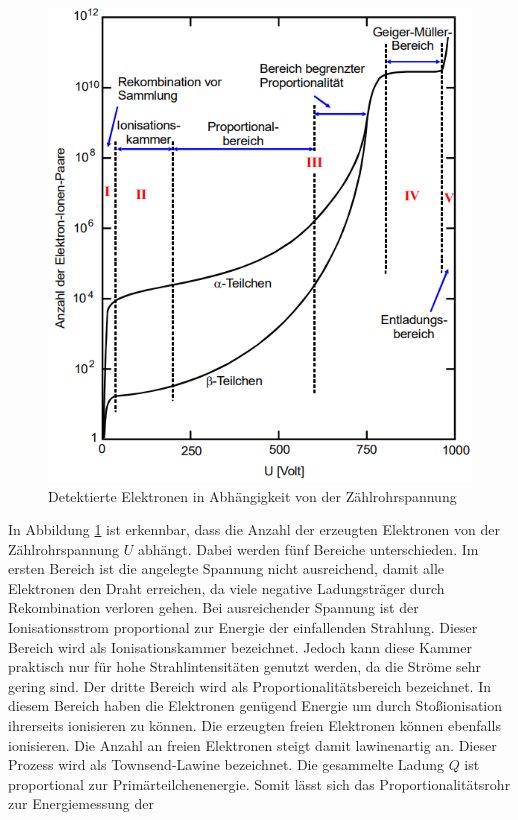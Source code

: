 \begin{figure}
    \centering
    \includegraphics[scale=0.6]{pics/Elektronen.png}
    \caption{Detektierte Elektronen in Abhängigkeit von der Zählrohrspannung}
    \label{fig:Elektronen}
  \end{figure}
In Abbildung \ref{fig:Elektronen} ist erkennbar, dass die Anzahl der erzeugten Elektronen von der Zählrohrspannung $U$ abhängt.
Dabei werden fünf Bereiche unterschieden. Im ersten Bereich ist die angelegte Spannung nicht ausreichend, damit alle Elektronen den Draht erreichen, da viele negative Ladungsträger
durch Rekombination verloren gehen.
Bei ausreichender Spannung ist der Ionisationsstrom proportional zur Energie der einfallenden Strahlung.
Dieser Bereich wird als Ionisationskammer bezeichnet.
Jedoch kann diese Kammer praktisch nur für hohe Strahlintensitäten genutzt werden, da die Ströme sehr gering sind.
Der dritte Bereich wird als Proportionalitätsbereich bezeichnet. In diesem Bereich haben die 
Elektronen genügend Energie um durch Stoßionisation ihrerseits ionisieren zu können.
Die erzeugten freien Elektronen können ebenfalls ionisieren. Die Anzahl an freien Elektronen steigt damit lawinenartig an. Dieser Prozess wird als
Townsend-Lawine bezeichnet. Die gesammelte Ladung $Q$ ist proportional zur Primärteilchenenergie. Somit lässt sich das Proportionalitätsrohr zur Energiemessung der
